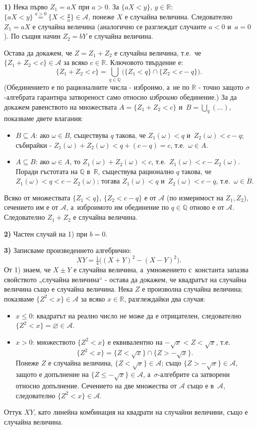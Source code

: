 \begin{proofbox}
\textbf{1)} Нека първо $Z_1=aX$ при $a>0$. За $\{aX<y\}$, $y\in
\mathbb R$: $\{aX<y\} \stackrel{a>0}{=} \{X<\tfrac{y}{a}\}\in
\mathcal{A}$, понеже $X$ е случайна величина. Следователно $Z_1=aX$
е случайна величина (аналогично се разглеждат случаите $a<0$ и~$a=0$). По същия начин $Z_2=bY$ е случайна величина.

Остава да докажем, че $Z=Z_1+Z_2$ е случайна величина, т.е.\ че
$\{Z_1+Z_2<c\}\in\mathcal A$ за всяко $c\in\mathbb R$. Ключовото
твърдение е:
\[
  \{Z_1+Z_2<c\} = \bigcup_{q\in\mathbb Q} \Big(\{Z_1<q\}\cap\{Z_2<c-q\}\Big).
\]
(Обединението е по рационалните числа - изброимо, а~не по
$\mathbb{R}$ - точно защото $\sigma$-алгебрата гарантира затвореност
само относно \emph{изброимо} обединение.) За да докажем равенството
на множествата $A=\{Z_1+Z_2<c\}$ и~$B=\bigcup_q(\dots)$, показваме
двете влагания:
\begin{itemize}[nosep]
  \item $B\subseteq A$: ако $\omega\in B$, съществува $q$ такова, че
  $Z_1(\omega)<q$ и~$Z_2(\omega)<c-q$; събирайки - $Z_1(\omega)+
  Z_2(\omega) < q+(c-q)=c$, т.е.\ $\omega\in A$.
  \item $A\subseteq B$: ако $\omega\in A$, то $Z_1(\omega)+
  Z_2(\omega)<c$, т.е.\ $Z_1(\omega) < c-Z_2(\omega)$. Поради
  гъстотата на $\mathbb Q$ в~$\mathbb R$, съществува рационално $q$
  такова, че $Z_1(\omega)<q<c-Z_2(\omega)$; тогава $Z_1(\omega)<q$ и~$Z_2(\omega)<c-q$, т.е.\ $\omega\in B$.
\end{itemize}
Всяко от множествата $\{Z_1<q\}$, $\{Z_2<c-q\}$ е от $\mathcal A$ (по
измеримост на $Z_1,Z_2$), сечението им е от $\mathcal A$, а~изброимото им обединение по $q\in\mathbb Q$ отново е от $\mathcal A$.
Следователно $Z_1+Z_2$ е случайна величина. \qedbg

\textbf{2)} Частен случай на 1) при $b=0$.

\textbf{3)} Записваме произведението алгебрично:
\[
  XY = \tfrac14\big((X+Y)^2-(X-Y)^2\big).
\]
От 1) знаем, че $X\pm Y$ е случайна величина, а~умножението с~константа запазва свойството „случайна величина“ - остава да
докажем, че квадратът на случайна величина също е случайна величина.
Нека $Z$ е произволна случайна величина; показваме $\{Z^2<x\}\in
\mathcal A$ за всяко $x\in\mathbb R$, разглеждайки два случая:
\begin{itemize}[nosep]
  \item $x\le 0$: квадратът на реално число не може да е отрицателен, следователно $\{Z^2<x\}=\varnothing\in\mathcal A$.
  \item $x>0$: множеството $\{Z^2<x\}$ е еквивалентно на $-\sqrt x < Z < \sqrt x$, т.е.
  \[
    \{Z^2<x\} = \{Z<\sqrt x\}\cap\{Z>-\sqrt x\}.
  \]
  Понеже $Z$ е случайна величина, $\{Z<\sqrt x\}\in\mathcal A$; също
  $\{Z>-\sqrt x\}\in\mathcal A$, защото е допълнение на
  $\{Z\le -\sqrt x\}\in\mathcal A$, а~$\sigma$-алгебрите са затворени
  относно допълнение. Сечението на две множества от $\mathcal A$
  също е в~$\mathcal A$, следователно $\{Z^2<x\}\in\mathcal A$.
\end{itemize}
Оттук $XY$, като линейна комбинация на квадрати на случайни
величини, също е случайна величина. \qedbg


\end{proofbox}
